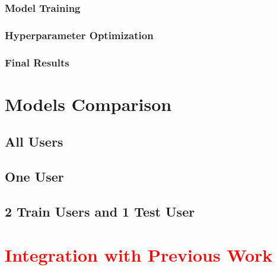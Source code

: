 \subsubsection{Model Training}

\subsubsection{Hyperparameter Optimization}

\subsubsection{Final Results}

\section{Models Comparison}

\subsection{All Users}

\subsection{One User}

\subsection{2 Train Users and 1 Test User}

\section{\textcolor{red}{Integration with Previous Work}}